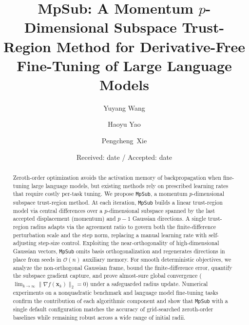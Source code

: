 \documentclass[smallextended]{svjour3}
\newcommand{\bx}{\bm{x}}
\begin{document}
\title{MpSub: A Momentum $p$-Dimensional Subspace Trust-Region Method for Derivative-Free Fine-Tuning of Large Language Models}

\author{Yuyang Wang \and Haoyu Yao \and \mbox{Pengcheng Xie}}


\date{Received: date / Accepted: date}

\maketitle

\begin{abstract}
Zeroth-order optimization avoids the activation memory of backpropagation when fine-tuning large language models, but existing methods rely on prescribed learning rates that require costly per-task tuning. We propose \texttt{MpSub}, a momentum $p$-dimensional subspace trust-region method. At each iteration, \texttt{MpSub} builds a linear trust-region model via central differences over a $p$-dimensional subspace spanned by the last accepted displacement (momentum) and $p-1$ Gaussian directions. A single trust-region radius adapts via the agreement ratio to govern both the finite-difference perturbation scale and the step norm, replacing a manual learning rate with self-adjusting step-size control. Exploiting the near-orthogonality of high-dimensional Gaussian vectors, \texttt{MpSub} omits basis orthogonalization and regenerates directions in place from seeds in $\mathcal{O}(n)$ auxiliary memory. For smooth deterministic objectives, we analyze the non-orthogonal Gaussian frame, bound the finite-difference error, quantify the subspace gradient capture, and prove almost-sure global convergence ($\lim_{k\to\infty} \|\nabla f(\bx_k)\|_2 = 0$) under a safeguarded radius update. Numerical experiments on a nonquadratic benchmark and language model fine-tuning tasks confirm the contribution of each algorithmic component and show that \texttt{MpSub} with a single default configuration matches the accuracy of grid-searched zeroth-order baselines while remaining robust across a wide range of initial radii.

\end{abstract}
\end{document}
